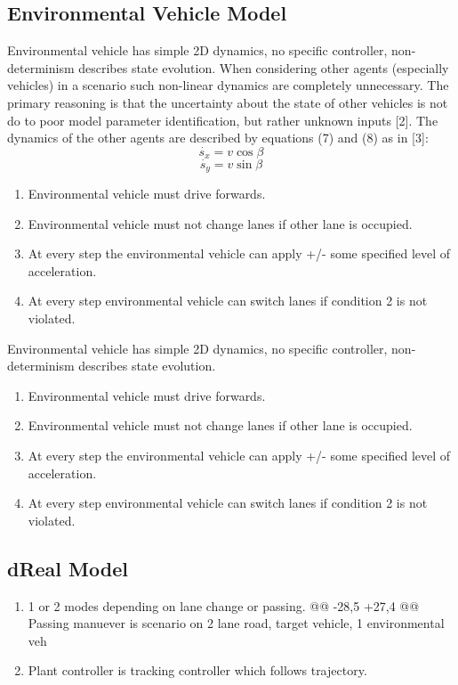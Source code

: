 \subsection{Environmental Vehicle Model}
Environmental vehicle has simple 2D dynamics, no specific controller, non-determinism describes state evolution. When considering other agents (especially vehicles) in a scenario such non-linear dynamics are completely unnecessary. The primary reasoning is that the uncertainty about the state of other vehicles is not do to poor model parameter identification, but rather unknown inputs [2]. The dynamics of the other agents are described by equations (7) and (8) as in [3]:
\begin{equation}
\dot{s_x}=v\cos{\beta}
\end{equation}
\begin{equation}
\dot{s_y}=v\sin{\beta}
\end{equation}

\begin{enumerate}
	\item Environmental vehicle must drive forwards.
	\item Environmental vehicle must not change lanes if other lane is occupied.
	\item At every step the environmental vehicle can apply +/- some specified level of acceleration.
	\item At every step environmental vehicle can switch lanes if condition 2 is not violated.
\end{enumerate}
Environmental vehicle has simple 2D dynamics, no specific controller, non-determinism describes state evolution.
\begin{enumerate}
	\item Environmental vehicle must drive forwards.
	\item Environmental vehicle must not change lanes if other lane is occupied.
	\item At every step the environmental vehicle can apply +/- some specified level of acceleration.
	\item At every step environmental vehicle can switch lanes if condition 2 is not violated.
\end{enumerate}
\subsection{dReal Model}
\begin{enumerate}
	\item 1 or 2 modes depending on lane change or passing.
	@@ -28,5 +27,4 @@ Passing manuever is scenario on 2 lane road, target vehicle, 1 environmental veh
	\item Plant controller is tracking controller which follows trajectory.
\end{enumerate}
